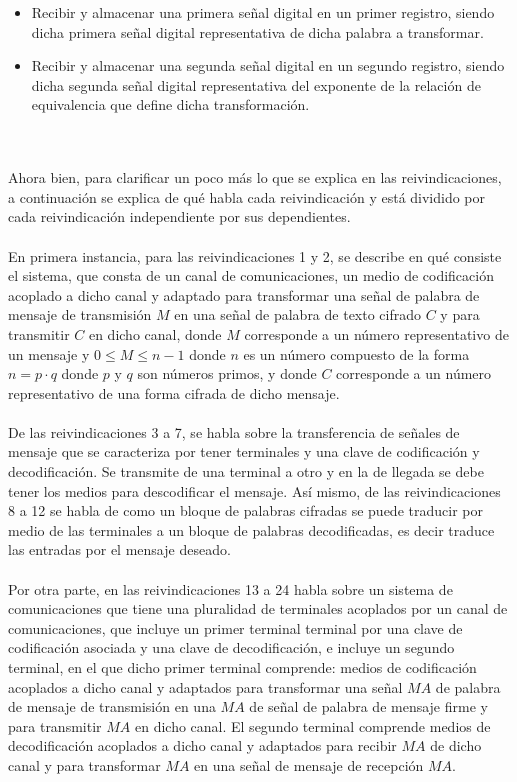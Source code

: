 \documentclass[12pt, a4paper]{article}
\begin{document}
	\begin{itemize}
		\item Recibir y almacenar una primera señal digital en un primer registro, siendo dicha primera señal digital representativa de dicha palabra a transformar.
		\item Recibir y almacenar una segunda señal digital en un segundo registro, siendo dicha segunda 		señal digital representativa del exponente de la relación de equivalencia que define dicha transformación.
	\end{itemize}
	\\
	\\Ahora bien, para clarificar un poco más lo que se explica en las reivindicaciones, a continuación se explica de qué habla cada reivindicación y está dividido por cada reivindicación independiente por sus dependientes.
	\\
	\\En primera instancia, para las reivindicaciones 1 y 2, se describe en qué consiste el sistema, que consta de un canal de comunicaciones, un medio de codificación acoplado a dicho canal y adaptado para transformar una señal de palabra de mensaje de transmisión $M$ en una señal de palabra de texto cifrado $C$ y para transmitir $C$ en dicho canal, donde $M$ corresponde a un número representativo de un mensaje y $0 \leq M \leq n-1$ donde $n$ es un número compuesto de la forma $n = p \cdot q$ donde $p$ y $q$ son números primos, y donde $C$ corresponde a un número representativo de una forma cifrada de dicho mensaje.
	\\
	\\De las reivindicaciones 3 a 7, se habla sobre la transferencia de señales de mensaje que se caracteriza por tener terminales y una clave de codificación y decodificación. Se transmite de una terminal a otro y en la de llegada se debe tener los medios para descodificar el mensaje. Así mismo, de las reivindicaciones 8 a 12 se habla de como un bloque de palabras cifradas se puede traducir por medio de las terminales a un bloque de palabras decodificadas, es decir traduce las entradas por el mensaje deseado.
	\\
	\\Por otra parte, en las reivindicaciones 13 a 24 habla sobre un sistema de comunicaciones que tiene una pluralidad de terminales acoplados por un canal de comunicaciones, que incluye un primer terminal terminal por una clave de codificación asociada y una clave de decodificación, e incluye un segundo terminal, en el que dicho primer terminal comprende: medios de codificación acoplados a dicho canal y adaptados para transformar una señal $MA$ de palabra de mensaje de transmisión en una $MA$ de señal de palabra de mensaje firme y para transmitir $MA$ en dicho canal. El segundo terminal comprende medios de decodificación acoplados a dicho canal y adaptados para recibir $MA$ de dicho canal y para transformar $MA$ en una señal de mensaje de recepción $MA$.
\end{document}
